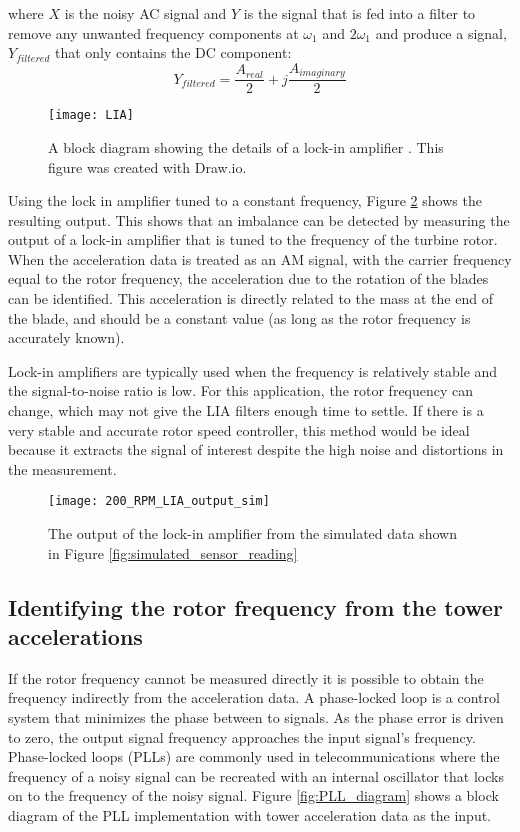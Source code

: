 where $X$ is the noisy AC signal and $Y$ is the signal that is fed into a filter to remove any unwanted frequency components at $\omega_1$ and $2 \omega_1$ and produce a signal, $Y_{filtered}$ that only contains the DC component:
\begin{equation}
	Y_{filtered} = \frac{A_{real}}{2} + j \frac{A_{imaginary}}{2}
\end{equation}

\begin{figure}
	\centering
	\texttt{[image: LIA]}
	\decoRule
	\caption{A block diagram showing the details of a lock-in amplifier \cite{LIA_fig}.  This figure was created with Draw.io.}
	\label{fig:LIA}
\end{figure}

Using the lock in amplifier tuned to a constant frequency, Figure \ref{fig:200_RPM_LIA_output_sim} shows the resulting output.  This shows that an imbalance can be detected by measuring the output of a lock-in amplifier that is tuned to the frequency of the turbine rotor.  When the acceleration data is treated as an AM signal, with the carrier frequency equal to the rotor frequency, the acceleration due to the rotation of the blades can be identified.  This acceleration is directly related to the mass at the end of the blade, and should be a constant value (as long as the rotor frequency is accurately known).

Lock-in amplifiers are typically used when the frequency is relatively stable and the signal-to-noise ratio is low.  For this application, the rotor frequency can change, which may not give the LIA filters enough time to settle.  If there is a very stable and accurate rotor speed controller, this method would be ideal because it extracts the signal of interest despite the high noise and distortions in the measurement.

\begin{figure}
	\centering
	\texttt{[image: 200\_RPM\_LIA\_output\_sim]}
	\decoRule
	\caption{The output of the lock-in amplifier from the simulated data shown in Figure \ref{fig:simulated_sensor_reading}}
	\label{fig:200_RPM_LIA_output_sim}
\end{figure}

\subsection{Identifying the rotor frequency from the tower accelerations}
If the rotor frequency cannot be measured directly it is possible to obtain the frequency indirectly from the acceleration data.  A phase-locked loop is a control system that minimizes the phase between to signals.  As the phase error is driven to zero, the output signal frequency approaches the input signal's frequency.  Phase-locked loops (PLLs) are commonly used in telecommunications where the frequency of a noisy signal can be recreated with an internal oscillator that locks on to the frequency of the noisy signal.  Figure \ref{fig:PLL_diagram} shows a block diagram of the PLL implementation with tower acceleration data as the input.

